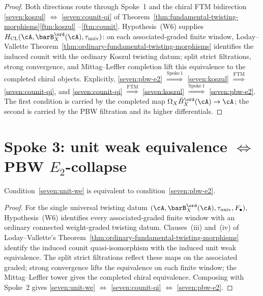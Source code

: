 \begin{proof}
Both directions route through Spoke~1 and the chiral FTM bidirection
\ref{seven:koszul} $\Leftrightarrow$ \ref{seven:counit-qi} of
Theorem~\ref{thm:fundamental-twisting-morphisms}\ref{ftm:koszul}%
--\ref{ftm:counit}.  Hypothesis~\textup{(W6)} supplies
$H_{\mathrm{CL}}(\cA,\barB_X^{\ord}(\cA),\tau_{\mathrm{univ}})$:
on each associated-graded finite window, Loday--Vallette
Theorem~\ref{thm:ordinary-fundamental-twisting-morphisms} identifies
the induced counit with the ordinary Koszul twisting datum; split
strict filtrations, strong convergence, and Mittag--Leffler completion
lift this equivalence to the completed chiral objects.  Explicitly,
\ref{seven:pbw-e2} $\stackrel{\mathrm{Spoke\,1}}{\Rightarrow}$
\ref{seven:koszul} $\stackrel{\mathrm{FTM}}{\Rightarrow}$
\ref{seven:counit-qi}, and
\ref{seven:counit-qi} $\stackrel{\mathrm{FTM}}{\Rightarrow}$
\ref{seven:koszul} $\stackrel{\mathrm{Spoke\,1}}{\Rightarrow}$
\ref{seven:pbw-e2}.  The first condition is carried by the completed
map $\Omega_X\bar B^{\ord}_X(\cA)\to\cA$; the second is carried by the
PBW filtration and its higher differentials.
\end{proof}

\section{Spoke 3: unit weak equivalence
\texorpdfstring{$\Leftrightarrow$}{iff} PBW $E_2$-collapse}
\label{sec:ftm-spoke-3}

\begin{proposition}
\label{prop:ftm-spoke-unit-pbw}
Condition~\ref{seven:unit-we} is equivalent to
condition~\ref{seven:pbw-e2}.
\end{proposition}

\begin{proof}
For the single universal twisting datum
$(\cA,\barB^{\ord}_X(\cA),\tau_{\mathrm{univ}},F_\bullet)$,
Hypothesis~\textup{(W6)} identifies every associated-graded finite
window with an ordinary connected weight-graded twisting datum.
Clauses~\textup{(iii)} and~\textup{(iv)} of Loday--Vallette's
Theorem~\ref{thm:ordinary-fundamental-twisting-morphisms} identify the
induced counit quasi-isomorphism with the induced unit weak
equivalence.  The split strict filtrations reflect these maps on the
associated graded; strong convergence lifts the equivalence on each
finite window; the Mittag--Leffler tower gives the completed chiral
equivalence.  Composing with Spoke~2 gives
\ref{seven:unit-we} $\Leftrightarrow$ \ref{seven:counit-qi}
$\Leftrightarrow$ \ref{seven:pbw-e2}.
\end{proof}

